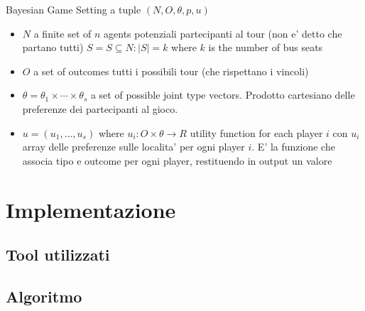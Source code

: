 \documentclass{report}
\begin{document}
Bayesian Game Setting a tuple $(N, O, \theta , p, u)$

\begin{itemize}
  \item $N$ a finite set of $n$ agents potenziali partecipanti al tour (non e' detto che partano tutti)
  \subitem{} $S = S \subseteq N: \lvert S \rvert = k $ where $k$ is the number of bus seats 
  \item $O$ a set of outcomes tutti i possibili tour (che rispettano i vincoli)
  \item $\theta = \theta_1 \times \cdots \times \theta_s$ a set of possible joint type vectors. Prodotto cartesiano delle preferenze dei partecipanti al gioco.
  \item $ u = (u_1, \dots, u_s) $ where $u_i: O \times \theta \to R  $ utility function for each player $i$ con $u_i$ array delle preferenze sulle localita' per ogni player $i$. E' la funzione che associa tipo e outcome per ogni player, restituendo in output un valore
\end{itemize}
\chapter{Implementazione}

\section{Tool utilizzati}

\section{Algoritmo}


\newpage{}
\listoffigures
\end{document}
